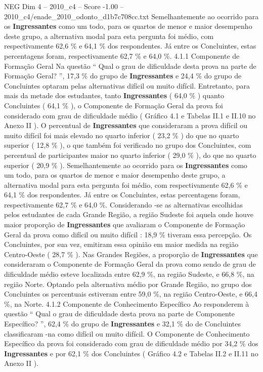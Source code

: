 \begin{textsample}{NEG Dim 4 – 2010\_c4 – Score -1.00 – 2010\_c4/enade\_2010\_odonto\_d1b7c708cc.txt}
Semelhantemente ao ocorrido para os \textbf{Ingressantes} como um todo, para os quartos de menor e maior desempenho deste grupo, a alternativa modal para esta pergunta foi médio, com respectivamente 62,6 \% e 64,1 \% dos respondentes.
Já entre os Concluintes, estas percentagens foram, respectivamente 62,7 \% e 64,0 \%. 4.1.1 Componente de Formação Geral Na questão “ Qual o grau de dificuldade desta prova na parte de Formação Geral? ”, 17,3 \% do grupo de \textbf{Ingressantes} e 24,4 \% do grupo de Concluintes optaram pelas alternativas difícil ou muito difícil.
Entretanto, para mais da metade dos estudantes, tanto \textbf{Ingressantes} ( 64,0 \% ) quanto Concluintes ( 64,1 \% ), o Componente de Formação Geral da prova foi considerado com grau de dificuldade médio ( Gráfico 4.1 e Tabelas II.1 e II.10 no Anexo II ).
O percentual de \textbf{Ingressantes} que consideraram a prova difícil ou muito difícil foi mais elevado no quarto inferior ( 23,2 \% ) do que no quarto superior ( 12,8 \% ), o que também foi verificado no grupo dos Concluintes, com percentual de participantes maior no quarto inferior ( 29,0 \% ), do que no quarto superior ( 20,9 \% ).
Semelhantemente ao ocorrido para os \textbf{Ingressantes} como um todo, para os quartos de menor e maior desempenho deste grupo, a alternativa modal para esta pergunta foi médio, com respectivamente 62,6 \% e 64,1 \% dos respondentes.
Já entre os Concluintes, estas percentagens foram, respectivamente 62,7 \% e 64,0 \%.
Considerando -se as alternativas escolhidas pelos estudantes de cada Grande Região, a região Sudeste foi aquela onde houve maior proporção de \textbf{Ingressantes} que avaliaram o Componente de Formação Geral da prova como difícil ou muito difícil : 18,9 \% tiveram essa percepção.
Os Concluintes, por sua vez, emitiram essa opinião em maior medida na região Centro-Oeste ( 28,7 \% ).
Nas Grandes Regiões, a proporção de \textbf{Ingressantes} que consideraram o Componente de Formação Geral da prova como sendo de grau de dificuldade médio esteve localizada entre 62,9 \%, na região Sudeste, e 66,8 \%, na região Norte.
Optando pela alternativa médio por Grande Região, no grupo dos Concluintes os percentuais estiveram entre 59,0 \%, na região Centro-Oeste, e 66,4 \%, na Norte. 4.1.2 Componente de Conhecimento Específico Ao responderem à questão “ Qual o grau de dificuldade desta prova na parte de Componente Específico? ”, 62,4 \% do grupo de \textbf{Ingressantes} e 32,1 \% do de Concluintes classificaram -na como difícil ou muito difícil.
O Componente de Conhecimento Específico da prova foi considerado com grau de dificuldade médio por 34,2 \% dos \textbf{Ingressantes} e por 62,1 \% dos Concluintes ( Gráfico 4.2 e Tabelas II.2 e II.11 no Anexo II ).

\end{textsample}
